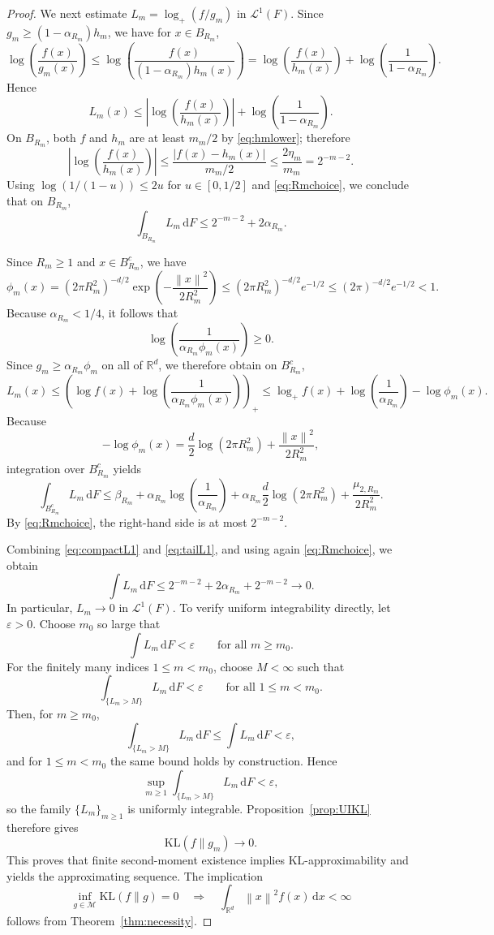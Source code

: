 \documentclass[10pt,a4paper]{amsart}
\begin{document}
\begin{proof}
We next estimate $L_m=\log_+(f/g_m)$ in $\mathcal L^1(F)$. Since $g_m\ge (1-\alpha_{R_m})h_m$, we have for $x\in B_{R_m}$,
\[
\log\!\left(\frac{f(x)}{g_m(x)}\right)
\le \log\!\left(\frac{f(x)}{(1-\alpha_{R_m})h_m(x)}\right)
=\log\!\left(\frac{f(x)}{h_m(x)}\right)+\log\!\left(\frac1{1-\alpha_{R_m}}\right).
\]
Hence
\[
L_m(x)\le \left|\log\!\left(\frac{f(x)}{h_m(x)}\right)\right|+\log\!\left(\frac1{1-\alpha_{R_m}}\right).
\]
On $B_{R_m}$, both $f$ and $h_m$ are at least $m_m/2$ by \eqref{eq:hmlower}; therefore
\[
\left|\log\!\left(\frac{f(x)}{h_m(x)}\right)\right|
\le \frac{|f(x)-h_m(x)|}{m_m/2}
\le \frac{2\eta_m}{m_m}=2^{-m-2}.
\]
Using $\log(1/(1-u))\le 2u$ for $u\in[0,1/2]$ and \eqref{eq:Rmchoice}, we conclude that on $B_{R_m}$,
\begin{equation}
\label{eq:compactL1}
\int_{B_{R_m}}L_m\,\mathrm{d}F \le 2^{-m-2}+2\alpha_{R_m}.
\end{equation}

Since $R_m\ge1$ and $x\in B_{R_m}^c$, we have
\[
\phi_m(x)
=(2\pi R_m^2)^{-d/2}\exp\!\left(-\frac{\left\lVert x \right\rVert^2}{2R_m^2}\right)
\le (2\pi R_m^2)^{-d/2}e^{-1/2}
\le (2\pi)^{-d/2}e^{-1/2}<1.
\]
Because $\alpha_{R_m}<1/4$, it follows that
\[
\log\!\left(\frac{1}{\alpha_{R_m}\phi_m(x)}\right)\ge0.
\]
Since $g_m\ge \alpha_{R_m}\phi_m$ on all of $\mathbb{R}^d$, we therefore obtain on $B_{R_m}^c$,
\[
L_m(x)
\le \left(\log f(x)+\log\!\left(\frac1{\alpha_{R_m}\phi_m(x)}\right)\right)_+
\le \log_+ f(x)+\log\!\left(\frac1{\alpha_{R_m}}\right)-\log\phi_m(x).
\]
Because
\[
-\log\phi_m(x)=\frac d2\log(2\pi R_m^2)+\frac{\left\lVert x \right\rVert^2}{2R_m^2},
\]
integration over $B_{R_m}^c$ yields
\begin{equation}
\label{eq:tailL1}
\int_{B_{R_m}^c}L_m\,\mathrm{d}F
\le \beta_{R_m}+\alpha_{R_m}\log\!\left(\frac1{\alpha_{R_m}}\right)+\alpha_{R_m}\frac d2\log(2\pi R_m^2)+\frac{\mu_{2,R_m}}{2R_m^2}.
\end{equation}
By \eqref{eq:Rmchoice}, the right-hand side is at most $2^{-m-2}$.

Combining \eqref{eq:compactL1} and \eqref{eq:tailL1}, and using again \eqref{eq:Rmchoice}, we obtain
\[
\int L_m\,\mathrm{d}F \le 2^{-m-2}+2\alpha_{R_m}+2^{-m-2}\to0.
\]
In particular, $L_m\to0$ in $\mathcal L^1(F)$. To verify uniform integrability directly, let $\varepsilon>0$. Choose $m_0$ so large that
\[
\int L_m\,\mathrm{d}F<\varepsilon
\qquad\text{for all }m\ge m_0.
\]
For the finitely many indices $1\le m<m_0$, choose $M<\infty$ such that
\[
\int_{\{L_m>M\}}L_m\,\mathrm{d}F<\varepsilon
\qquad\text{for all }1\le m<m_0.
\]
Then, for $m\ge m_0$,
\[
\int_{\{L_m>M\}}L_m\,\mathrm{d}F\le \int L_m\,\mathrm{d}F<\varepsilon,
\]
and for $1\le m<m_0$ the same bound holds by construction. Hence
\[
\sup_{m\ge1}\int_{\{L_m>M\}}L_m\,\mathrm{d}F<\varepsilon,
\]
so the family $\{L_m\}_{m\ge1}$ is uniformly integrable. Proposition~\ref{prop:UIKL} therefore gives
\[
\mathrm{KL}(f\|g_m)\to0.
\]
This proves that finite second-moment existence implies KL-approximability and yields the approximating sequence. The implication
\[
\inf_{g\in\mathcal M}\mathrm{KL}(f\|g)=0
\quad\Longrightarrow\quad
\int_{\mathbb{R}^d}\left\lVert x \right\rVert^2f(x)\,\mathrm{d}x<\infty
\]
follows from Theorem~\ref{thm:necessity}.
\end{proof}
\end{document}
